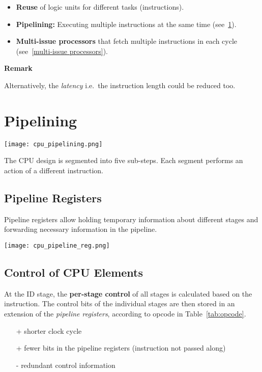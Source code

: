\begin{multicols*}{2}
    \begin{itemize}
        \item \textbf{Reuse} of logic units for different tasks (instructions).
        \item \textbf{Pipelining:} Executing multiple instructions at the same time (see~\ref{pipelining}).
        \item \textbf{Multi-issue processors} that fetch multiple instructions in each cycle (see~\ref{multi-issue processors}).
    \end{itemize}

    \textbf{Remark}

    Alternatively, the \textit{latency} i.e.\ the instruction length could be reduced too.

    \section{Pipelining}\label{pipelining}

    \texttt{[image: cpu\_pipelining.png]}

    The CPU design is segmented into five sub-steps. Each segment performs an action of a different instruction.

    \subsection{Pipeline Registers}
    Pipeline registers allow holding temporary information about different stages and forwarding necessary information in the pipeline.
    \begin{center}
        \texttt{[image: cpu\_pipeline\_reg.png]}
    \end{center}

    \subsection{Control of CPU Elements}
    At the ID stage, the \textbf{per-stage control} of all stages is calculated based on the instruction.
    The control bits of the individual stages are then stored in an extension of the \textit{pipeline registers}, according to opcode in Table~\ref{tab:opcode}.
    \begin{itemize}
        \item[+] shorter clock cycle
        \item[+] fewer bits in the pipeline registers (instruction not passed along)
        \item[-] redundant control information
    \end{itemize}


\end{multicols*}
